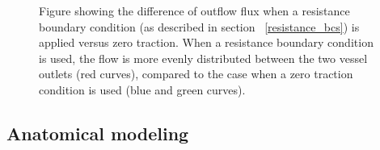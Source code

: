 \begin{figure}
  \begin{center}  \end{center} \caption{Figure showing the difference of outflow
    flux when a resistance boundary condition (as described in section
    ~\ref{resistance_bcs}) is applied versus zero traction. When a
    resistance boundary condition is used, the flow is more evenly
    distributed between the two vessel outlets (red curves), compared
    to the case when a zero traction condition is used (blue and green
    curves).}
  \label{fig:kvs-2:resistance_bcs_fig}
\end{figure}

\subsection{Anatomical modeling} \label{vmtk}

